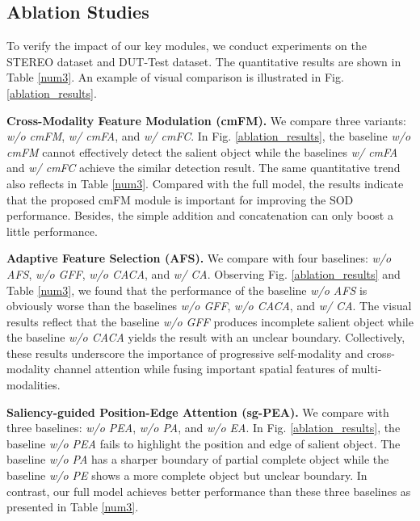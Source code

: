 \documentclass[runningheads]{llncs}
\begin{document}
\subsection{Ablation Studies}


To verify the impact of our key modules, we conduct experiments on the STEREO dataset and DUT-Test dataset. The quantitative results are shown in Table \ref{num3}. An example of visual comparison is illustrated in Fig. \ref{ablation_results}.


\noindent
\textbf{Cross-Modality Feature Modulation (cmFM).} We compare three variants: \textit{w/o cmFM}, \textit{w/ cmFA}, and \textit{w/ cmFC}. In Fig. \ref{ablation_results}, the baseline  \textit{w/o cmFM} cannot effectively detect the salient object while the baselines \textit{w/ cmFA} and \textit{w/ cmFC} achieve the similar detection result. The same quantitative trend also reflects in  Table \ref{num3}. Compared with the full model, the results indicate that the proposed cmFM module is important for improving the SOD performance. Besides, the simple addition and concatenation can only boost a little performance.

\noindent
\textbf{Adaptive Feature Selection (AFS).}
We compare with four baselines: \textit{w/o AFS}, \textit{w/o GFF}, \textit{w/o CACA}, and \textit{ w/ CA}.   Observing Fig. \ref{ablation_results} and Table \ref{num3}, we found that the performance of the baseline  \textit{w/o AFS} is obviously worse than the baselines \textit{w/o GFF}, \textit{w/o CACA}, and \textit{w/ CA}. The visual results reflect that the baseline \textit{w/o GFF} produces incomplete salient object while the baseline \textit{w/o CACA} yields the result with an unclear boundary.  Collectively, these results underscore the importance of progressive self-modality and cross-modality channel attention while fusing important spatial features of multi-modalities.



\noindent
\textbf{Saliency-guided Position-Edge Attention (sg-PEA).} We compare with three baselines: \textit{w/o PEA}, \textit{w/o PA}, and \textit{w/o EA}. In Fig. \ref{ablation_results}, the baseline \textit{w/o PEA} fails to highlight the position and edge of salient object. The baseline \textit{w/o PA} has a sharper boundary of partial complete object while the baseline \textit{w/o PE} shows a more complete object but unclear boundary. In contrast, our full model achieves better performance than these three baselines as presented in Table \ref{num3}.
\end{document}
